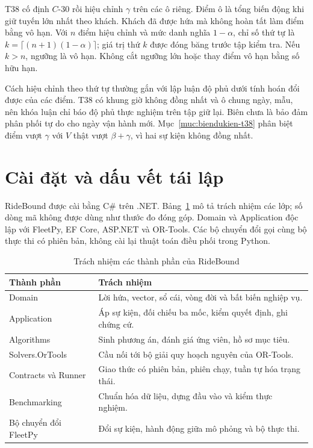 T38 cố định $C$-30 rồi hiệu chỉnh $\gamma$ trên các ô riêng. Điểm ô là tổng biến động khi
giữ tuyến lớn nhất theo khách. Khách đã được hứa mà không hoàn tất làm điểm bằng vô hạn.
Với $n$ điểm hiệu chỉnh và mức danh nghĩa $1-\alpha$, chỉ số thứ tự là
$k=\lceil(n+1)(1-\alpha)\rceil$; giá trị thứ $k$ được đóng băng trước tập kiểm tra. Nếu
$k>n$, ngưỡng là vô hạn. Không cắt ngưỡng lớn hoặc thay điểm vô hạn bằng số hữu hạn.

Cách hiệu chỉnh theo thứ tự thường gắn với lập luận độ phủ dưới tính hoán đổi được của các
điểm. T38 có khung giờ không đồng nhất và ô chung ngày, mẫu, nên khóa luận chỉ báo độ phủ
thực nghiệm trên tập giữ lại. Biên chưa là bảo đảm phân phối tự do cho ngày vận hành mới.
Mục~\ref{muc:biendukien-t38} phân biệt điểm vượt $\gamma$ với $V$ thật vượt $\beta+\gamma$, vì hai
sự kiện không đồng nhất.

\section{Cài đặt và dấu vết tái lập}


RideBound được cài bằng C\# trên .NET. Bảng~\ref{bang:kientruc} mô tả trách nhiệm các lớp;
số dòng mã không được dùng như thước đo đóng góp. Domain và Application độc lập với
FleetPy, EF Core, ASP.NET và OR-Tools. Các bộ chuyển đổi gọi cùng bộ thực thi có phiên bản, không
cài lại thuật toán điều phối trong Python.

\begin{table}[htbp]
\centering
\caption{Trách nhiệm các thành phần của RideBound}
\label{bang:kientruc}
\begin{tabularx}{\linewidth}{@{}lX@{}}
\toprule
\textbf{Thành phần} & \textbf{Trách nhiệm}\\
\midrule
Domain & Lời hứa, vector, sổ cái, vòng đời và bất biến nghiệp vụ.\\
Application & Áp sự kiện, đối chiếu ba mốc, kiểm quyết định, ghi chứng cứ.\\
Algorithms & Sinh phương án, đánh giá ứng viên, hồ sơ mục tiêu.\\
Solvers.OrTools & Cầu nối tới bộ giải quy hoạch nguyên của OR-Tools.\\
Contracts và Runner & Giao thức có phiên bản, phiên chạy, tuần tự hóa trạng thái.\\
Benchmarking & Chuẩn hóa dữ liệu, dựng đầu vào và kiểm thực nghiệm.\\
Bộ chuyển đổi FleetPy & Đổi sự kiện, hành động giữa mô phỏng và bộ thực thi.\\
\bottomrule
\end{tabularx}
\end{table}

